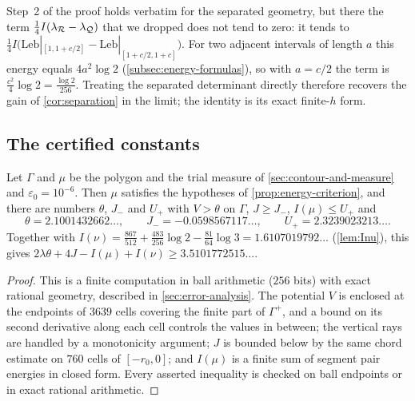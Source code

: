 \begin{remark}\label{rem:separated-energy}
Step~2 of the proof holds verbatim for the separated geometry, but there the term
$\frac14I(\lambda_{\mathcal{R}}-\lambda_{\mathcal{Q}})$ that we dropped does not tend to zero: it tends to
$\frac14I\bigl(\mathrm{Leb}|_{[1,1+c/2]}-\mathrm{Leb}|_{[1+c/2,1+c]}\bigr)$. For two adjacent
intervals of length $a$ this energy equals $4a^2\log2$ (\cref{subsec:energy-formulas}), so with
$a=c/2$ the term is $\frac{c^2}4\log2=\frac{\log2}{256}$. Treating the separated determinant
directly therefore recovers the gain of \cref{cor:separation} in the limit; the identity is its
exact finite-$h$ form.
\end{remark}

\subsection{The certified constants}\label{subsec:energy-certificate}

\begin{proposition}\label{prop:energy-certificate}
Let $\Gamma$ and $\mu$ be the polygon and the trial measure of \cref{sec:contour-and-measure} and
$\varepsilon_0=10^{-6}$. Then $\mu$ satisfies the hypotheses of \cref{prop:energy-criterion}, and
there are numbers $\theta$, $J_-$ and $U_+$ with $V>\theta$ on $\Gamma$, $J\ge J_-$,
$I(\mu)\le U_+$ and
\[
  \theta=2.1001432662\ldots,\qquad J_-=-0.0598567117\ldots,\qquad U_+=2.3239023213\ldots .
\]
Together with $I(\nu)=\frac{867}{512}+\frac{483}{256}\log2-\frac{81}{64}\log3=1.6107019792\ldots$
(\cref{lem:Inu}), this gives $2\lambda\theta+4J-I(\mu)+I(\nu)\ge3.5101772515\ldots$.
\end{proposition}

\begin{proof}
This is a finite computation in ball arithmetic ($256$ bits) with exact rational geometry,
described in \cref{sec:error-analysis}. The potential $V$ is enclosed at the endpoints of $3639$
cells covering the finite part of $\Gamma^+$, and a bound on its second derivative along each cell
controls the values in between; the vertical rays are handled by a monotonicity argument;
$J$ is bounded below by the same chord estimate on $760$ cells of $[-r_0,0]$; and $I(\mu)$ is a
finite sum of segment pair energies in closed form. Every asserted inequality is checked on ball
endpoints or in exact rational arithmetic.
\end{proof}

